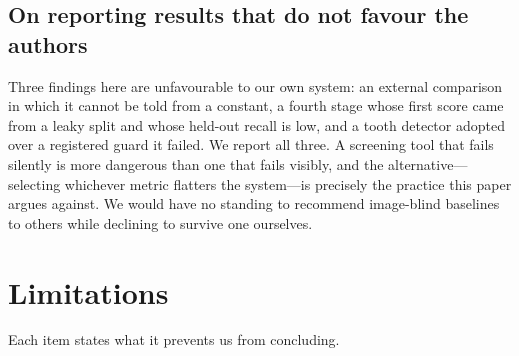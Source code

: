 \documentclass[conference]{IEEEtran}
\begin{document}
\subsection{On reporting results that do not favour the authors}
Three findings here are unfavourable to our own system: an external comparison
in which it cannot be told from a constant, a fourth stage whose first score
came from a leaky split and whose held-out recall is low, and a tooth detector adopted over a registered guard it failed. We
report all three. A screening tool
that fails silently is more dangerous than one that fails visibly, and the
alternative---selecting whichever metric flatters the system---is precisely the
practice this paper argues against. We would have no standing to recommend
image-blind baselines to others while declining to survive one ourselves.

\section{Limitations}
\label{sec:limits}

Each item states what it prevents us from concluding.
\end{document}
